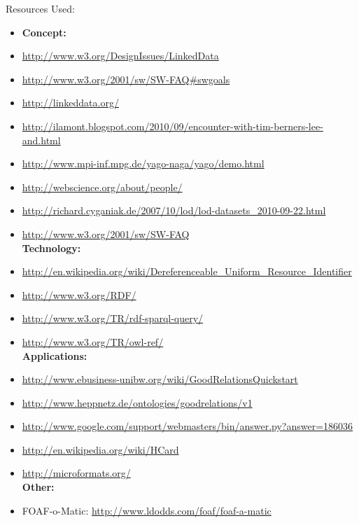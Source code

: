 \documentclass{beamer}
\begin{document}
\begin{frame}{Resources Used:}
\tiny
\begin{itemize}
\item \textbf{Concept:}
\item \url{http://www.w3.org/DesignIssues/LinkedData}
\item \url{http://www.w3.org/2001/sw/SW-FAQ#swgoals}
\item \url{http://linkeddata.org/}
\item \url{http://ilamont.blogspot.com/2010/09/encounter-with-tim-berners-lee-and.html}
\item \url{http://www.mpi-inf.mpg.de/yago-naga/yago/demo.html}
\item \url{http://webscience.org/about/people/}
\item \url{http://richard.cyganiak.de/2007/10/lod/lod-datasets\_2010-09-22.html}
\item \url{http://www.w3.org/2001/sw/SW-FAQ}\\
\vspace{0.1cm}
\textbf{Technology:}
\item \url{http://en.wikipedia.org/wiki/Dereferenceable_Uniform_Resource_Identifier}
\item \url{http://www.w3.org/RDF/}
\item \url{http://www.w3.org/TR/rdf-sparql-query/}
\item \url{http://www.w3.org/TR/owl-ref/}\\
\vspace{0.1cm}
\textbf{Applications:}
\item \url{http://www.ebusiness-unibw.org/wiki/GoodRelationsQuickstart}
\item \url{http://www.heppnetz.de/ontologies/goodrelations/v1}
\item \url{http://www.google.com/support/webmasters/bin/answer.py?answer=186036}
\item \url{http://en.wikipedia.org/wiki/HCard}
\item \url{http://microformats.org/}\\
\vspace{0.1cm}
\textbf{Other:}
\item FOAF-o-Matic: \url{http://www.ldodds.com/foaf/foaf-a-matic}
\end{itemize}
\end{frame}
\end{document}
